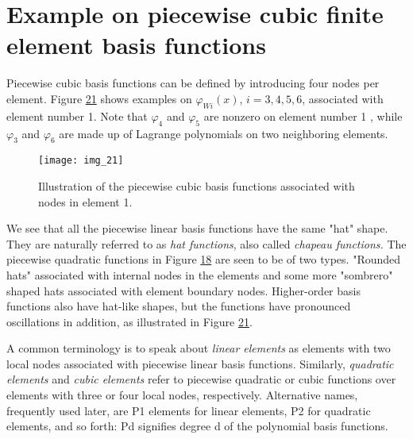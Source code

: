 \documentclass[../main.tex]{subfiles}
\begin{document}
	\section[Example on piecewise cubic finite element basis functions]{Example on piecewise cubic finite element basis functions}
	\label{sec:sec_3_5}
	Piecewise cubic basis functions can be defined by introducing four nodes per element. Figure \hyperref[fig:img_21]{21} shows examples on $\varphi_{Wi}(x)$, $i=3,4,5,6$, associated with element number 1. Note that $\varphi_{4}$ and $\varphi_{5}$ are nonzero on element number 1 , while $\varphi_{3}$ and $\varphi_{6}$ are made up of Lagrange polynomials on two neighboring elements.
	\begin{figure}[H]
		\centering
		\texttt{[image: img\_21]}
		\caption{Illustration of the piecewise cubic basis functions associated with
			nodes in element 1.}
		\label{fig:img_21}
	\end{figure}
	
	We see that all the piecewise linear basis functions have the same "hat" shape.
	They are naturally referred to as \textit{hat functions}, also called \textit{chapeau functions.}
	The piecewise quadratic functions in Figure \hyperref[fig:img_18]{18} are seen to be of two types.
	"Rounded hats" associated with internal nodes in the elements and some more
	"sombrero" shaped hats associated with element boundary nodes. Higher-order
	basis functions also have hat-like shapes, but the functions have pronounced
	oscillations in addition, as illustrated in Figure \hyperref[fig:img_21]{21}.
	
	A common terminology is to speak about \textit{linear elements} as elements with two
	local nodes associated with piecewise linear basis functions. Similarly, \textit{quadratic
		elements} and \textit{cubic elements} refer to piecewise quadratic or cubic functions
	over elements with three or four local nodes, respectively. Alternative names,
	frequently used later, are P1 elements for linear elements, P2 for quadratic
	elements, and so forth: Pd signifies degree d of the polynomial basis functions.
	
\end{document}
